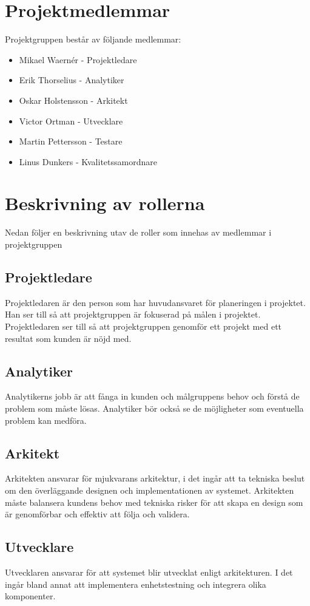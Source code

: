 \section{Projektmedlemmar}
Projektgruppen består av följande medlemmar:
\begin{itemize}
\item Mikael Waernér - Projektledare
\item Erik Thorselius - Analytiker
\item Oskar Holstensson - Arkitekt 
\item Victor Ortman - Utvecklare
\item Martin Pettersson - Testare
\item Linus Dunkers - Kvalitetssamordnare
\end{itemize}

\section{Beskrivning av rollerna}
Nedan följer en beskrivning utav de roller som innehas av medlemmar i projektgruppen

\subsection*{Projektledare}
Projektledaren är den person som har huvudansvaret för planeringen i projektet. Han ser till så att projektgruppen är fokuserad på målen i projektet. Projektledaren ser till så att projektgruppen genomför ett projekt med ett resultat som kunden är nöjd med.

\subsection*{Analytiker}
Analytikerns jobb är att fånga in kunden och målgruppens behov och förstå de problem som måste lösas. Analytiker bör också se de möjligheter som eventuella problem kan medföra.

\subsection*{Arkitekt}
Arkitekten ansvarar för mjukvarans arkitektur, i det ingår att ta tekniska beslut om den överläggande designen och implementationen av systemet. Arkitekten måste balansera kundens behov med tekniska risker för att skapa en design som är genomförbar och effektiv att följa och validera.

\subsection*{Utvecklare}
Utvecklaren ansvarar för att systemet blir utvecklat enligt arkitekturen. I det ingår bland annat att implementera enhetstestning och integrera olika komponenter.

